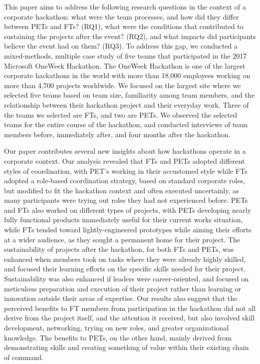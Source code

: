 \documentclass{hcij}
\begin{document}
This paper aims to address the following research questions in the context of a corporate hackathon: what were the team processes, and how did they differ between PETs and FTs? (RQ1), what were the conditions that contributed to sustaining the projects after the event? (RQ2), and what impacts did participants believe the event had on them? (RQ3). To address this gap, we conducted a mixed-methods, multiple case study of five teams that participated in the 2017 Microsoft OneWeek Hackathon. The OneWeek Hackathon is one of the largest corporate hackathons in the world with more than 18,000 employees working on more than 4,700 projects worldwide. We focused on the largest site where we selected five teams based on team size, familiarity among team members, and the relationship between their hackathon project and their everyday work. Three of the teams we selected are FTs, and two are PETs. We observed the selected teams for the entire course of the hackathon, and conducted interviews of team members before, immediately after, and four months after the hackathon.

Our paper contributes several new insights about how hackathons operate in a corporate context. Our analysis revealed that FTs and PETs adopted different styles of coordination, with PET’s working in their accustomed style while FTs adopted a role-based coordination strategy, based on standard corporate roles, but modified to fit the hackathon context and often executed uncertainly, as many participants were trying out roles they had not experienced before. PETs and FTs also worked on different types of projects, with PETs developing nearly fully functional products immediately useful for their current works situation, while FTs tended toward lightly-engineered prototypes while aiming their efforts at a wider audience, as they sought a permanent home for their project. The sustainability of projects after the hackathon, for both FTs and PETs, was enhanced when members took on tasks where they were already highly skilled, and focused their learning efforts on the specific skills needed for their project. Sustainability was also enhanced if leaders were career-oriented, and focused on meticulous preparation and execution of their project rather than learning or innovation outside their areas of expertise. Our results also suggest that the perceived benefits to FT members from participation in the hackathon did not all derive from the project itself, and the attention it received, but also involved skill development, networking, trying on new roles, and greater organizational knowledge. The benefits to PETs, on the other hand, mainly derived from demonstrating skills and creating something of value within their existing chain of command.
\end{document}
